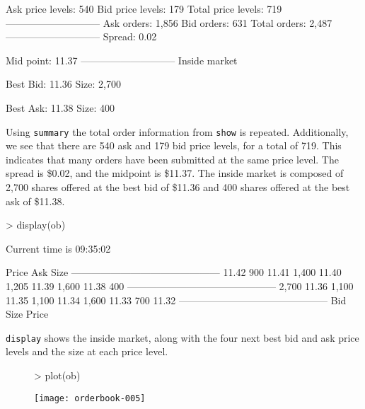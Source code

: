 \documentclass[a4paper]{report}
\begin{document}
\begin{article}
\begin{Schunk}
\begin{Soutput}
Ask price levels:   540 
Bid price levels:   179 
Total price levels: 719 
-----------------------------
Ask orders:         1,856 
Bid orders:         631 
Total orders:       2,487 
-----------------------------
Spread:             0.02 

Mid point:          11.37 
-----------------------------
Inside market 
 
Best Bid:           11.36 
Size:               2,700 
 
Best Ask:           11.38 
Size:               400 
\end{Soutput}
\end{Schunk}

Using \texttt{summary} the total order information from \texttt{show}
is repeated. Additionally, we see that there are 540 ask and 179 bid
price levels, for a total of 719. This indicates that many orders
have been submitted at the same price level.  The spread is \$0.02,
and the midpoint is \$11.37. The inside market is composed of 2,700
shares offered at the best bid of \$11.36 and 400 shares offered at
the best ask of \$11.38.

\begin{Schunk}
\begin{Sinput}
> display(ob)
\end{Sinput}
\begin{Soutput}
Current time is 09:35:02 

		 Price 	 Ask Size
---------------------------------------------
		 11.42 	 900 
		 11.41 	 1,400 
		 11.40 	 1,205 
		 11.39 	 1,600 
		 11.38 	 400 
---------------------------------------------
  2,700 	 11.36 
  1,100 	 11.35 
  1,100 	 11.34 
  1,600 	 11.33 
    700 	 11.32 
---------------------------------------------
Bid Size 	 Price
\end{Soutput}
\end{Schunk}

\texttt{display} shows the inside market, along with the four next
best bid and ask price levels and the size at each price level.

\begin{figure}
\centering
\vspace*{.1in}
\begin{Schunk}
\begin{Sinput}
> plot(ob)
\end{Sinput}
\end{Schunk}
\texttt{[image: orderbook-005]}
\end{figure}


\end{article}
\end{document}
